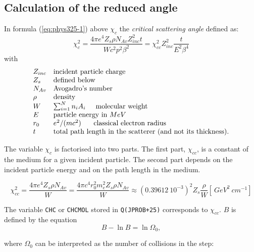 \subsection{Calculation of the reduced angle}
In formula (\ref{eq:phys325-1}) above $\chi_c$ the {\it critical
scattering angle} defined as:
\begin{equation}
\chi^2_c = \frac{4 \pi e^4  Z_s \rho N_{Av} Z_{inc}^2 t}{W c^2 p^2\beta^2} 
= \chi^2_{cc} Z_{inc}^2 \frac{t}{E^2\beta^4}
\end{equation}
with
\[
\begin{array}{ll}
Z_{inc} & \mbox{incident particle charge}               \\
Z_{s}   & \mbox{defined below}                           \\
N_{Av}  & \mbox{Avogadro's number}                      \\
\rho  & \mbox{density}                                  \\
W     & \sum_{i=1}^{N} n_i A_i \mbox{\hspace{0.5cm}molecular weight}  \\
E     & \mbox{particle energy in $MeV$}                    \\
r_0   & e^2/(m c^2) \mbox{\hspace{0.5cm} classical electron radius} \\
t     & \mbox{total path length in the scatterer (and not its thickness).}
\end{array}
\]

The variable $\chi_c$ is factorised into two parts.
The first part, $\chi_{cc}$, is a constant of the medium for 
a given incident particle.
The second part depends on the incident particle energy and on the
path length in the medium. 

\begin{equation}
\chi^2_{cc} = \frac{4 \pi e^{4} Z_s \rho N_{Av}}{W} = \frac{4 \pi c^4 r_0^2
m_e^2 Z_s \rho N_{Av}}{W} \approx (0.39612 \: 10^{-3})^2
Z_s \frac{\rho}{W}
\left [ \: GeV^2 \: cm^{-1} \right ] 
\end{equation}

The variable {\tt CHC} or {\tt CHCMOL} stored in {\tt Q(JPROB+25)} corresponds
to $\chi_{cc}$. 
$B$ is defined by the equation
\begin{equation}
\label{eq:phys325-2}
B-\ln B =\ln\Omega_0, 
\end{equation}

where $\Omega_0$ can be interpreted as the number of collisions in the step:

